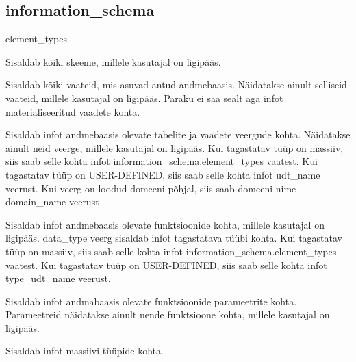 \documentclass[a4paper,12pt]{article} %
\begin{document}
\subsection{information\_schema}
\begin{labeling}{element\_types}
\item [schemata] Sisaldab kõiki skeeme, millele kasutajal on ligipääs.
\item [views] Sisaldab kõiki vaateid, mis asuvad antud andmebaasis. Näidatakse ainult selliseid vaateid, millele kasutajal on ligipääs. Paraku ei saa sealt aga infot materialiseeritud vaadete kohta.
\item [columns] Sisaldab infot andmebaasis olevate tabelite ja vaadete veergude kohta. Näidatakse ainult neid veerge, millele kasutajal on ligipääs. Kui tagastatav tüüp on massiiv, siis saab selle kohta infot information\_schema.element\_types vaatest. Kui tagastatav tüüp on USER-DEFINED, siis saab selle kohta infot udt\_name veerust. Kui veerg on loodud domeeni põhjal, siis saab domeeni nime domain\_name veerust
\item [routines] Sisaldab infot andmebaasis olevate funktsioonide kohta, millele kasutajal on ligipääs. data\_type veerg sisaldab infot tagastatava tüübi kohta. Kui tagastatav tüüp on massiiv, siis saab selle kohta infot information\_schema.element\_types vaatest. Kui tagastatav tüüp on USER-DEFINED, siis saab selle kohta infot type\_udt\_name veerust.
\item [parameters] Sisaldab infot andmabaasis olevate funktsioonide parameetrite kohta. Parameetreid näidatakse ainult nende funktsioone kohta, millele kasutajal on ligipääs.
\item [element\_types] Sisaldab infot massiivi tüüpide kohta.
\end{labeling}
\cite{PostgreSQLInformationSchema}
\end{document}
